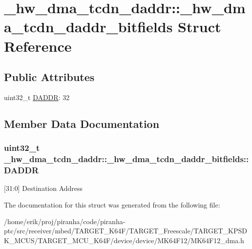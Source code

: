 \hypertarget{struct__hw__dma__tcdn__daddr_1_1__hw__dma__tcdn__daddr__bitfields}{}\section{\+\_\+hw\+\_\+dma\+\_\+tcdn\+\_\+daddr\+:\+:\+\_\+hw\+\_\+dma\+\_\+tcdn\+\_\+daddr\+\_\+bitfields Struct Reference}
\label{struct__hw__dma__tcdn__daddr_1_1__hw__dma__tcdn__daddr__bitfields}
\subsection*{Public Attributes}
\begin{DoxyCompactItemize}
\item 
uint32\+\_\+t \hyperlink{struct__hw__dma__tcdn__daddr_1_1__hw__dma__tcdn__daddr__bitfields_a5b617dda39ddabb32730ecc94fe5e0d2}{D\+A\+D\+DR}\+: 32
\end{DoxyCompactItemize}


\subsection{Member Data Documentation}
\subsubsection[{\texorpdfstring{D\+A\+D\+DR}{DADDR}}]{\setlength{\rightskip}{0pt plus 5cm}uint32\+\_\+t \+\_\+hw\+\_\+dma\+\_\+tcdn\+\_\+daddr\+::\+\_\+hw\+\_\+dma\+\_\+tcdn\+\_\+daddr\+\_\+bitfields\+::\+D\+A\+D\+DR}\hypertarget{struct__hw__dma__tcdn__daddr_1_1__hw__dma__tcdn__daddr__bitfields_a5b617dda39ddabb32730ecc94fe5e0d2}{}\label{struct__hw__dma__tcdn__daddr_1_1__hw__dma__tcdn__daddr__bitfields_a5b617dda39ddabb32730ecc94fe5e0d2}
\mbox{[}31\+:0\mbox{]} Destination Address 

The documentation for this struct was generated from the following file\+:\begin{DoxyCompactItemize}
\item 
/home/erik/proj/piranha/code/piranha-\/ptc/src/receiver/mbed/\+T\+A\+R\+G\+E\+T\+\_\+\+K64\+F/\+T\+A\+R\+G\+E\+T\+\_\+\+Freescale/\+T\+A\+R\+G\+E\+T\+\_\+\+K\+P\+S\+D\+K\+\_\+\+M\+C\+U\+S/\+T\+A\+R\+G\+E\+T\+\_\+\+M\+C\+U\+\_\+\+K64\+F/device/device/\+M\+K64\+F12/M\+K64\+F12\+\_\+dma.\+h\end{DoxyCompactItemize}
